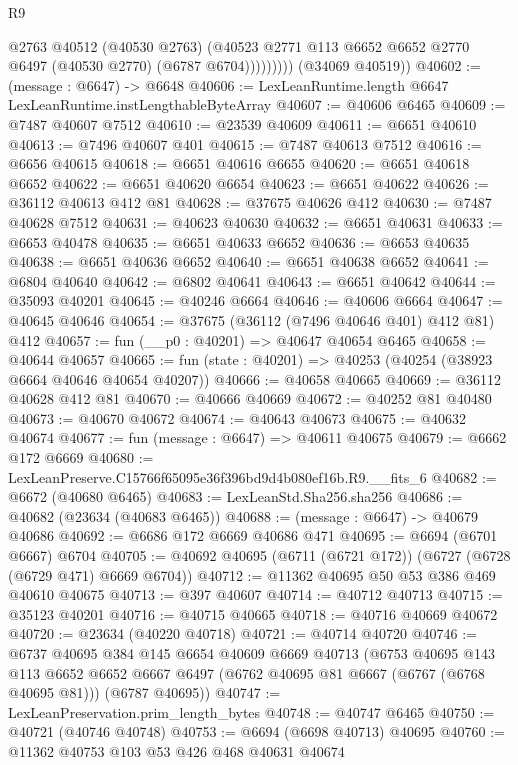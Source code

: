 \begin{lexlean}{R9}
\begin{coremodule}
                    @2763
                    @40512
                    (@40530 @2763)
                    (@40523 @2771 @113 @6652 @6652 @2770 @6497 (@40530 @2770) (@6787 @6704)))))))))
      (@34069 @40519))
@40602 := (message : @6647) -> @6648
@40606 := LexLeanRuntime.length @6647 LexLeanRuntime.instLengthableByteArray
@40607 := @40606 @6465
@40609 := @7487 @40607 @7512
@40610 := @23539 @40609
@40611 := @6651 @40610
@40613 := @7496 @40607 @401
@40615 := @7487 @40613 @7512
@40616 := @6656 @40615
@40618 := @6651 @40616 @6655
@40620 := @6651 @40618 @6652
@40622 := @6651 @40620 @6654
@40623 := @6651 @40622
@40626 := @36112 @40613 @412 @81
@40628 := @37675 @40626 @412
@40630 := @7487 @40628 @7512
@40631 := @40623 @40630
@40632 := @6651 @40631
@40633 := @6653 @40478
@40635 := @6651 @40633 @6652
@40636 := @6653 @40635
@40638 := @6651 @40636 @6652
@40640 := @6651 @40638 @6652
@40641 := @6804 @40640
@40642 := @6802 @40641
@40643 := @6651 @40642
@40644 := @35093 @40201
@40645 := @40246 @6664
@40646 := @40606 @6664
@40647 := @40645 @40646
@40654 := @37675 (@36112 (@7496 @40646 @401) @412 @81) @412
@40657 := fun (__p0 : @40201) => @40647 @40654 @6465
@40658 := @40644 @40657
@40665 := fun (state : @40201) => @40253 (@40254 (@38923 @6664 @40646 @40654 @40207))
@40666 := @40658 @40665
@40669 := @36112 @40628 @412 @81
@40670 := @40666 @40669
@40672 := @40252 @81 @40480
@40673 := @40670 @40672
@40674 := @40643 @40673
@40675 := @40632 @40674
@40677 := fun (message : @6647) => @40611 @40675
@40679 := @6662 @172 @6669
@40680 := LexLeanPreserve.C15766f65095e36f396bd9d4b080ef16b.R9.__fits_6
@40682 := @6672 (@40680 @6465)
@40683 := LexLeanStd.Sha256.sha256
@40686 := @40682 (@23634 (@40683 @6465))
@40688 := (message : @6647) -> @40679 @40686
@40692 := @6686 @172 @6669 @40686 @471
@40695 := @6694 (@6701 @6667) @6704
@40705 := @40692 @40695 (@6711 (@6721 @172)) (@6727 (@6728 (@6729 @471) @6669 @6704))
@40712 := @11362 @40695 @50 @53 @386 @469 @40610 @40675
@40713 := @397 @40607
@40714 := @40712 @40713
@40715 := @35123 @40201
@40716 := @40715 @40665
@40718 := @40716 @40669 @40672
@40720 := @23634 (@40220 @40718)
@40721 := @40714 @40720
@40746 := @6737
    @40695
    @384
    @145
    @6654
    @40609
    @6669
    @40713
    (@6753
      @40695
      @143
      @113
      @6652
      @6652
      @6667
      @6497
      (@6762 @40695 @81 @6667 (@6767 (@6768 @40695 @81)))
      (@6787 @40695))
@40747 := LexLeanPreservation.prim_length_bytes
@40748 := @40747 @6465
@40750 := @40721 (@40746 @40748)
@40753 := @6694 (@6698 @40713) @40695
@40760 := @11362 @40753 @103 @53 @426 @468 @40631 @40674

\end{coremodule}
\end{lexlean}
